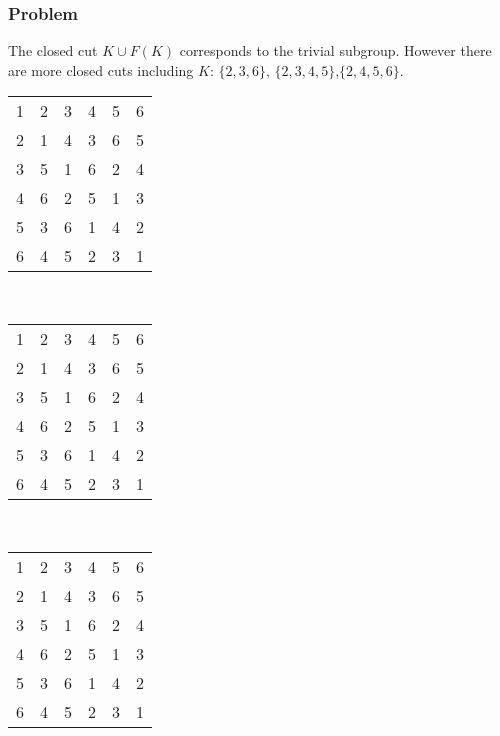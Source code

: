 \documentclass{beamer}
\begin{document}
\begin{frame}\frametitle{Problem}
The closed cut $K\cup F(K)$ corresponds to the trivial subgroup.  However there are more closed cuts including $K$: $\{2,3,6\}$, $\{2,3,4,5\}$,$\{2,4,5,6\}$.
\begin{center}
\begin{tabular}{@{}c@{}c@{}c@{}c@{}c@{}c@{}}
1&\color{lgr}2&\color{lgr}3&4&5&\color{lgr}6\\
\color{lgr}2&\color{lgr}1&\color{lgr}4&\color{lgr}3&\color{lgr}6&\color{lgr}5\\
\color{lgr}3&\color{lgr}5&\color{lgr}1&\color{lgr}6&\color{lgr}2&\color{lgr}4\\
4&\color{lgr}6&\color{lgr}2&5&1&\color{lgr}3\\
5&\color{lgr}3&\color{lgr}6&1&4&\color{lgr}2\\
\color{lgr}6&\color{lgr}4&\color{lgr}5&\color{lgr}2&\color{lgr}3&\color{lgr}1\\
\end{tabular}\ \ \ \ 
\begin{tabular}{@{}c@{}c@{}c@{}c@{}c@{}c@{}}
1&\color{lgr}2&\color{lgr}3&\color{lgr}4&\color{lgr}5&6\\
\color{lgr}2&\color{lgr}1&\color{lgr}4&\color{lgr}3&\color{lgr}6&\color{lgr}5\\
\color{lgr}3&\color{lgr}5&\color{lgr}1&\color{lgr}6&\color{lgr}2&\color{lgr}4\\
\color{lgr}4&\color{lgr}6&\color{lgr}2&\color{lgr}5&\color{lgr}1&\color{lgr}3\\
\color{lgr}5&\color{lgr}3&\color{lgr}6&\color{lgr}1&\color{lgr}4&\color{lgr}2\\
6&\color{lgr}4&\color{lgr}5&\color{lgr}2&\color{lgr}3&1\\
\end{tabular}\ \ \ \ 
\begin{tabular}{@{}c@{}c@{}c@{}c@{}c@{}c@{}}
1&\color{lgr}2&3&\color{lgr}4&\color{lgr}5&\color{lgr}6\\
\color{lgr}2&\color{lgr}1&\color{lgr}4&\color{lgr}3&\color{lgr}6&\color{lgr}5\\
3&\color{lgr}5&1&\color{lgr}6&\color{lgr}2&\color{lgr}4\\
\color{lgr}4&\color{lgr}6&\color{lgr}2&\color{lgr}5&\color{lgr}1&\color{lgr}3\\
\color{lgr}5&\color{lgr}3&\color{lgr}6&\color{lgr}1&\color{lgr}4&\color{lgr}2\\
\color{lgr}6&\color{lgr}4&\color{lgr}5&\color{lgr}2&\color{lgr}3&\color{lgr}1\\

\end{tabular}
\end{center}
\end{frame}
\end{document}
